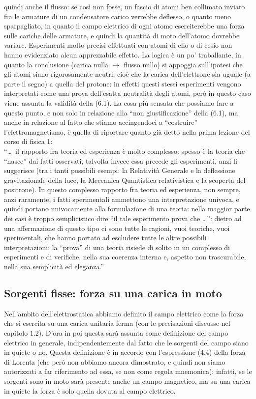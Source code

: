 quindi anche il flusso: se cos\`i non fosse, un fascio di atomi ben collimato
inviato fra le armature di un condensatore carico verrebbe deflesso, o quanto
meno sparpagliato, in quanto il campo elettrico di ogni atomo eserciterebbe una
forza sulle cariche delle armature, e quindi la quantit\`a di moto dell'atomo
dovrebbe variare. Esperimenti molto precisi effettuati con atomi di elio o di
cesio non hanno evidenziato alcun apprezzabile effetto. La logica \`e un po'
traballante, in quanto la conclusione (carica nulla $\to$ flusso nullo) si
appoggia sull'ipotesi che gli atomi siano rigorosamente neutri, cio\`e che la
carica dell'elettrone sia uguale (a parte il segno) a quella del protone: in
effetti questi stessi esperimenti vengono interpretati come una prova
dell'esatta neutralit\`a degli atomi, per\`o in questo caso viene assunta la
validit\`a della (6.1). La cosa pi\`u sensata che possiamo fare a questo punto,
e non solo in relazione alla ``non giustificazione'' della (6.1), ma anche in
relazione al fatto che stiamo accingendoci a ``costruire'' l'elettromagnetismo,
\`e quella di riportare quanto gi\`a detto nella prima lezione del corso di
fisica 1:\\
``\dots\ il rapporto fra teoria ed esperienza \`e molto complesso: spesso \`e la
teoria che ``nasce'' dai fatti osservati, talvolta invece essa precede gli
esperimenti, anzi li suggerisce (tra i tanti possibili esempi: la Relativit\`a
Generale e la deflessione gravitazionale della luce, la Meccanica Quantistica
relativistica e la scoperta del positrone). In questo complesso rapporto fra
teoria ed esperienza, non sempre, anzi raramente, i fatti sperimentali ammettono
una interpretazione univoca, e quindi portano univocamente alla formulazione di
una teoria: nella maggior parte dei casi \`e troppo semplicistico dire ``il tale
esperimento prova che \dots'': dietro ad una affermazione di questo tipo ci sono
tutte le ragioni, vuoi teoriche, vuoi sperimentali, che hanno portato ad
escludere tutte le altre possibili interpretazioni: la ``prova'' di una teoria
risiede di solito in un complesso di esperimenti e di verifiche, nella sua
coerenza interna e, aspetto non trascurabile, nella sua semplicit\`a ed
eleganza.''

\subsection{Sorgenti fisse: forza su una carica in moto}

Nell'ambito dell'elettrostatica abbiamo definito il campo elettrico come la
forza che si esercita su una carica unitaria ferma (con le precisazioni discusse
nel capitolo 1.2). D'ora in poi questa sar\`a assunta come definizione del campo
elettrico in generale, indipendentemente dal fatto che le sorgenti del campo
siano in quiete o no. Questa definizione \`e in accordo con l'espressione (4.4)
della forza di Lorentz (che per\`o non abbiamo ancora dimostrato, e quindi non
siamo autorizzati a far riferimento ad essa, se non come regola mnemonica):
infatti, se le sorgenti sono in moto sar\`a presente anche un campo magnetico,
ma su una carica in quiete la forza \`e solo quella dovuta al campo elettrico.

